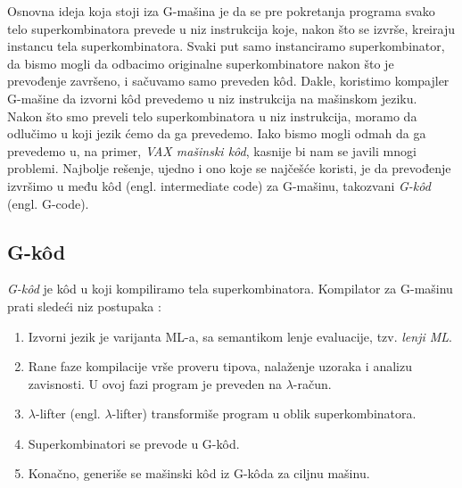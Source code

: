 Osnovna ideja koja stoji iza G-mašina je da se pre pokretanja programa svako telo superkombinatora prevede u niz instrukcija koje, nakon što se izvrše, kreiraju instancu tela superkombinatora. Svaki put samo instanciramo superkombinator, da bismo mogli da odbacimo originalne superkombinatore nakon što je prevođenje završeno, i sačuvamo samo preveden k\^ od. Dakle, koristimo kompajler G-mašine da izvorni k\^ od prevedemo u niz instrukcija na mašinskom jeziku. \\

Nakon što smo preveli telo superkombinatora u niz instrukcija, moramo da odlučimo u koji jezik ćemo da ga prevedemo. Iako bismo mogli odmah da ga prevedemo u, na primer, {\em VAX mašinski k\^ od}, kasnije bi nam se javili mnogi problemi.
Najbolje rešenje, ujedno i ono koje se najčešće koristi, je da prevođenje izvršimo u među k\^ od (engl. intermediate code) za G-mašinu, takozvani {\em G-k\^ od} (engl. G-code). \\

\subsection{G-k\^ od}

{\em G-k\^ od} je k\^ od u koji kompiliramo tela superkombinatora. Kompilator za G-mašinu prati sledeći niz postupaka \cite{the-implementation-of-functional-programming-languages, abstract-machines}:
\begin{enumerate}
\item Izvorni jezik je varijanta ML-a, sa semantikom lenje evaluacije, tzv. {\em lenji ML}.
\item Rane faze kompilacije vrše proveru tipova, nalaženje uzoraka i analizu zavisnosti. U ovoj fazi program je preveden na $\lambda$-račun.
\item $\lambda$-lifter (engl. $\lambda$-lifter) transformiše program u oblik superkombinatora.   
\item Superkombinatori se prevode u G-k\^ od.
\item Konačno, generiše se mašinski k\^ od iz G-k\^ oda za ciljnu mašinu.
\end{enumerate}

